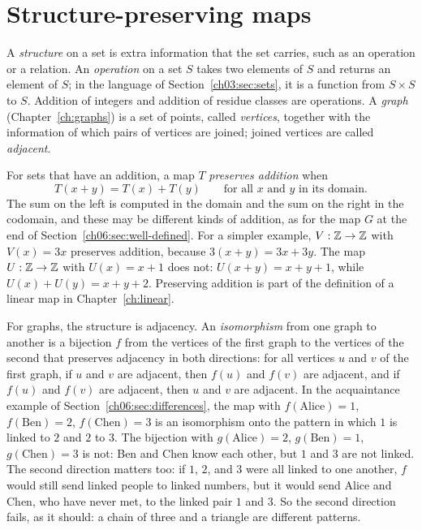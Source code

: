 \section{Structure-preserving maps}\label{ch06:sec:structure}
A \emph{structure} on a set is extra information that the set carries, such as an operation or a relation. An \emph{operation} on a set $S$ takes two elements of $S$ and returns an element of $S$; in the language of Section~\ref{ch03:sec:sets}, it is a function from $S\times S$ to $S$. Addition of integers and addition of residue classes are operations. A \emph{graph} (Chapter~\ref{ch:graphs}) is a set of points, called \emph{vertices}, together with the information of which pairs of vertices are joined; joined vertices are called \emph{adjacent}.

For sets that have an addition, a map $T$ \emph{preserves addition} when
\[
T(x+y)=T(x)+T(y)\qquad\text{for all $x$ and $y$ in its domain.}
\]
The sum on the left is computed in the domain and the sum on the right in the codomain, and these may be different kinds of addition, as for the map $G$ at the end of Section~\ref{ch06:sec:well-defined}. For a simpler example, $V:\mathbb Z\to\mathbb Z$ with $V(x)=3x$ preserves addition, because $3(x+y)=3x+3y$. The map $U:\mathbb Z\to\mathbb Z$ with $U(x)=x+1$ does not: $U(x+y)=x+y+1$, while $U(x)+U(y)=x+y+2$. Preserving addition is part of the definition of a linear map in Chapter~\ref{ch:linear}.

For graphs, the structure is adjacency. An \emph{isomorphism} from one graph to another is a bijection $f$ from the vertices of the first graph to the vertices of the second that preserves adjacency in both directions: for all vertices $u$ and $v$ of the first graph, if $u$ and $v$ are adjacent, then $f(u)$ and $f(v)$ are adjacent, and if $f(u)$ and $f(v)$ are adjacent, then $u$ and $v$ are adjacent. In the acquaintance example of Section~\ref{ch06:sec:differences}, the map with $f(\text{Alice})=1$, $f(\text{Ben})=2$, $f(\text{Chen})=3$ is an isomorphism onto the pattern in which $1$ is linked to $2$ and $2$ to $3$. The bijection with $g(\text{Alice})=2$, $g(\text{Ben})=1$, $g(\text{Chen})=3$ is not: Ben and Chen know each other, but $1$ and $3$ are not linked. The second direction matters too: if $1$, $2$, and $3$ were all linked to one another, $f$ would still send linked people to linked numbers, but it would send Alice and Chen, who have never met, to the linked pair $1$ and $3$. So the second direction fails, as it should: a chain of three and a triangle are different patterns.

